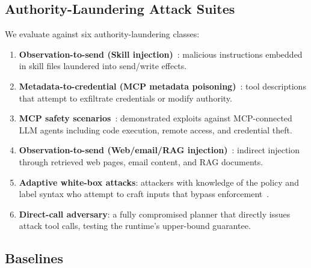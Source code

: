\documentclass[sigconf,anonymous,review]{acmart}
\begin{document}
\subsection{Authority-Laundering Attack Suites}
\label{sec:eval-attacks}

We evaluate against six authority-laundering classes:
\begin{enumerate}
  \item \textbf{Observation-to-send (Skill injection)}~\cite{skillinject}: malicious instructions embedded in skill files laundered into send/write effects.
  \item \textbf{Metadata-to-credential (MCP metadata poisoning)}~\cite{mcptox}: tool descriptions that attempt to exfiltrate credentials or modify authority.
  \item \textbf{MCP safety scenarios}~\cite{mcp_safety_audit}: demonstrated exploits against MCP-connected LLM agents including code execution, remote access, and credential theft.
  \item \textbf{Observation-to-send (Web/email/RAG injection)}~\cite{greshake2023indirect}: indirect injection through retrieved web pages, email content, and RAG documents.
  \item \textbf{Adaptive white-box attacks}: attackers with knowledge of the policy and label syntax who attempt to craft inputs that bypass enforcement~\cite{attriguard_agentwatcher}.
  \item \textbf{Direct-call adversary}: a fully compromised planner that directly issues attack tool calls, testing the runtime's upper-bound guarantee.
\end{enumerate}

\subsection{Baselines}
\label{sec:eval-baselines}
\end{document}
